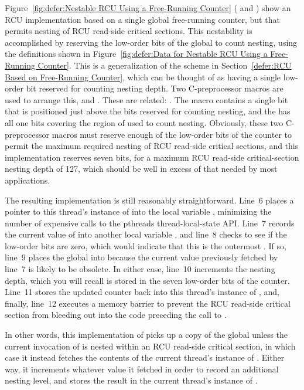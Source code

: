 Figure~\ref{fig:defer:Nestable RCU Using a Free-Running Counter}
( and )
show an RCU implementation based on a single global free-running counter,
but that permits nesting of RCU read-side critical sections.
This nestability is accomplished by reserving the low-order bits of the
global  to count nesting, using the definitions shown in
Figure~\ref{fig:defer:Data for Nestable RCU Using a Free-Running Counter}.
This is a generalization of the scheme in
Section~\ref{defer:RCU Based on Free-Running Counter},
which can be thought of as having a single low-order bit reserved
for counting nesting depth.
Two C-preprocessor macros are used to arrange this,
 and
.
These are related: .
The  macro contains a single bit that is
positioned just above the bits reserved for counting nesting,
and the  has all one bits covering the
region of  used to count nesting.
Obviously, these two C-preprocessor macros must reserve enough
of the low-order bits of the counter to permit the maximum required
nesting of RCU read-side critical sections, and this implementation
reserves seven bits, for a maximum RCU read-side critical-section
nesting depth of 127, which should be well in excess of that needed
by most applications.

The resulting  implementation is still reasonably
straightforward.
Line~6 places a pointer to this thread's instance of 
into the local variable , minimizing the number of expensive
calls to the pthreads thread-local-state API.
Line~7 records the current value of  into another
local variable , and line~8 checks to see if the low-order
bits are zero, which would indicate that this is the outermost
.
If so, line~9 places the global  into  because
the current value previously fetched by line~7 is likely to be obsolete.
In either case, line~10 increments the nesting depth, which you will
recall is stored in the seven low-order bits of the counter.
Line~11 stores the updated counter back into this thread's instance
of , and, finally, line~12 executes a memory
barrier to prevent the RCU read-side critical section from bleeding out
into the code preceding the call to .

In other words, this implementation of  picks up a copy
of the global  unless the current invocation of
 is nested within an RCU read-side critical section,
in which case it instead fetches the contents of the current thread's
instance of .
Either way, it increments whatever value it fetched in order to record
an additional nesting level, and stores the result in the current
thread's instance of .

